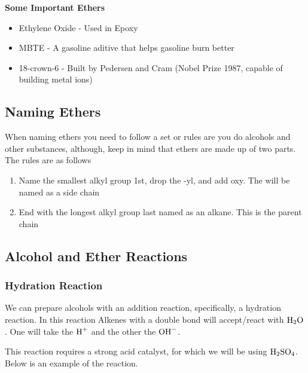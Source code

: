 \documentclass[12pt, a4paper]{article}
\begin{document}
    \noindent\textbf{Some Important Ethers}

    \begin{itemize}
        
        \item Ethylene Oxide - Used in Epoxy
        \item MBTE - A gasoline aditive that helps gasoline burn better
        \item 18-crown-6 - Built by Pedersen and Cram (Nobel Prize 1987, capable of building metal ions)

    \end{itemize}

    \subsection{Naming Ethers}
    
    When naming ethers you need to follow a set or rules are you do alcohols and other substances, 
    although, keep in mind that ethers are made up of two parts. The rules are as follows

    \begin{enumerate}
        
        \item Name the smallest alkyl group 1st, drop the -yl, and add oxy. The will
              be named as a side chain
        \item End with the longest alkyl group last named as an alkane. This is the parent chain

    \end{enumerate}

    \subsection{Alcohol and Ether Reactions}

    \subsubsection{Hydration Reaction}

    We can prepare alcohols with an addition reaction, specifically, a hydration reaction. In this
    reaction Alkenes with a double bond will accept/react with $\ce{H2O}$. One will take the $\ce{H+}$ 
    and the other the $\ce{OH-}$. 

    This reaction requires a strong acid catalyst, for which we will be using $\ce{H2SO4}$. Below is an example 
    of the reaction.
\end{document}

